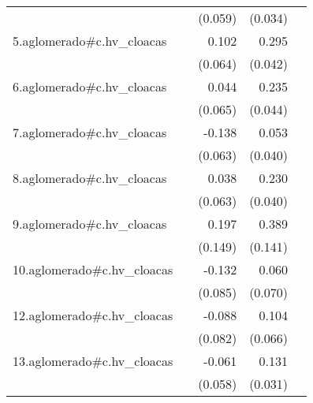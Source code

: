 {\begin{longtable}{l*{4}{D{.}{.}{-1}}}
            &                     &     (0.059)         &     (0.034)         &                     \\
\addlinespace
5.aglomerado#c.hv\_cloacas&                     &       0.102         &       0.295\sym{***}&                     \\
            &                     &     (0.064)         &     (0.042)         &                     \\
\addlinespace
6.aglomerado#c.hv\_cloacas&                     &       0.044         &       0.235\sym{***}&                     \\
            &                     &     (0.065)         &     (0.044)         &                     \\
\addlinespace
7.aglomerado#c.hv\_cloacas&                     &      -0.138\sym{*}  &       0.053         &                     \\
            &                     &     (0.063)         &     (0.040)         &                     \\
\addlinespace
8.aglomerado#c.hv\_cloacas&                     &       0.038         &       0.230\sym{***}&                     \\
            &                     &     (0.063)         &     (0.040)         &                     \\
\addlinespace
9.aglomerado#c.hv\_cloacas&                     &       0.197         &       0.389\sym{**} &                     \\
            &                     &     (0.149)         &     (0.141)         &                     \\
\addlinespace
10.aglomerado#c.hv\_cloacas&                     &      -0.132         &       0.060         &                     \\
            &                     &     (0.085)         &     (0.070)         &                     \\
\addlinespace
12.aglomerado#c.hv\_cloacas&                     &      -0.088         &       0.104         &                     \\
            &                     &     (0.082)         &     (0.066)         &                     \\
\addlinespace
13.aglomerado#c.hv\_cloacas&                     &      -0.061         &       0.131\sym{***}&                     \\
            &                     &     (0.058)         &     (0.031)         &                     \\

\end{longtable}}
